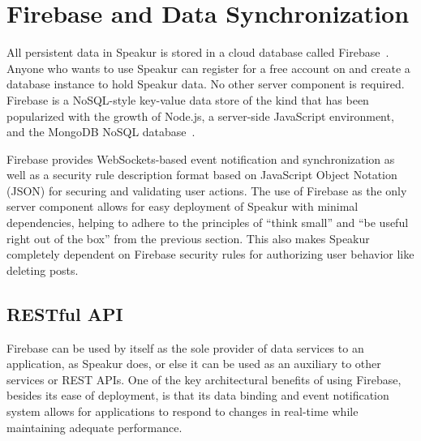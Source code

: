 \section{Firebase and Data Synchronization}
All persistent data in Speakur is stored in a cloud database called Firebase~\cite{firebasecontributors2015}.
Anyone who wants to use Speakur can register for a free account on  and create a database instance to hold Speakur data.
No other server component is required.
Firebase is a NoSQL-style key-value data store of the kind that has been popularized
with the growth of 
Node.js, a server-side JavaScript environment,
and the MongoDB NoSQL database~\cite{dickey2014}.

Firebase provides WebSockets-based event notification and synchronization 
as well as a security rule description format based on 
JavaScript Object Notation (JSON)
for securing and validating user actions.
The use of Firebase as the only server component allows for easy deployment of Speakur with minimal dependencies, helping to adhere to the principles of ``think small'' and ``be useful right out of the box'' from the previous section.
This also makes Speakur completely dependent on Firebase security rules for authorizing user behavior like deleting posts.

\subsection{RESTful API}
Firebase can be used by itself as the sole provider of data services to an application, as Speakur does, or else it can be used as an auxiliary to other services or REST APIs.
One of the key architectural benefits of using Firebase, 
besides its ease of deployment, 
is that its data binding and event notification system allows for 
applications to respond to changes in real-time while maintaining adequate performance.

